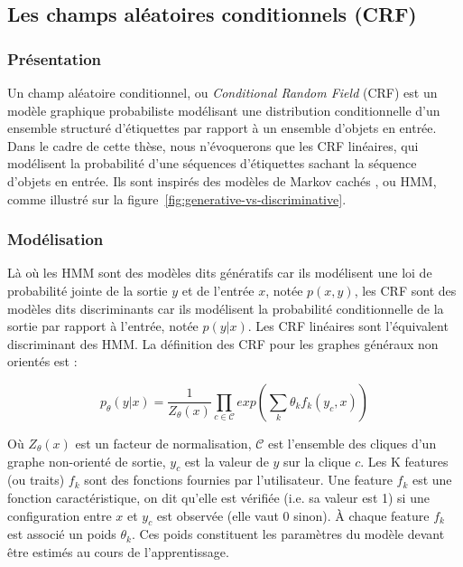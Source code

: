 \documentclass[12pt,a4paper,times,twoside,openright]{report}
\begin{document}
        
        \subsection{Les champs aléatoires conditionnels (CRF)}
        \label{subsec:CRFs}
        
            \subsubsection{Présentation}
            \label{subsubsec:CRFs-introduction}
Un champ aléatoire conditionnel, ou \textit{Conditional Random Field} (CRF) \citep{Lafferty01} est un modèle graphique probabiliste \citep{koller2009probabilistic,gaussier2011modeles} modélisant une distribution conditionnelle d'un ensemble structuré d'étiquettes par rapport à un ensemble d'objets en entrée. Dans le cadre de cette thèse, nous n'évoquerons que les CRF linéaires, qui modélisent la probabilité d'une séquences d'étiquettes sachant la séquence d'objets en entrée. Ils sont inspirés des modèles de Markov cachés \citep{baum1966statistical}, ou HMM, comme illustré sur la figure\ \ref{fig:generative-vs-discriminative}.


            
            \subsubsection{Modélisation}
            \label{subsubsec:CRFs-modelisation}
Là où les HMM sont des modèles dits génératifs \citep{gaussier2011modeles} car ils modélisent une loi de probabilité jointe de la sortie $y$ et de l'entrée $x$, notée $p(x,y)$, les CRF sont des modèles dits discriminants car ils modélisent la probabilité conditionnelle de la sortie par rapport à l'entrée, notée $p(y|x)$. Les CRF linéaires sont l'équivalent discriminant des HMM. La définition des CRF pour les graphes généraux non orientés est :

\begin{equation}\label{eq:general-CRF}
p_\theta(y|x) = \frac{1}{Z_\theta(x)} \prod_{c \in \mathcal{C}} exp \left(\sum_{k} \theta_{k} f_{k}(y_{c}, x) \right)
\end{equation}

Où $Z_\theta(x)$ est un facteur de normalisation, $\mathcal{C}$ est l'ensemble des cliques d'un graphe non-orienté de sortie, $y_{c}$ est la valeur de $y$ sur la clique $c$. Les K features (ou traits) $f_{k}$ sont des fonctions fournies par l'utilisateur. Une feature $f_{k}$ est une fonction caractéristique, on dit qu'elle est vérifiée (i.e. sa valeur est 1) si une configuration entre $x$ et $y_{c}$ est observée (elle vaut 0 sinon). À chaque feature $f_{k}$ est associé un poids $\theta_{k}$. Ces poids constituent les paramètres du modèle devant être estimés au cours de l'apprentissage.
\end{document}
